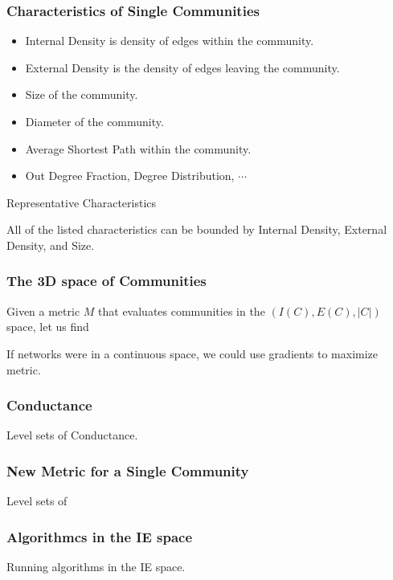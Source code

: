 \documentclass{beamer}
\begin{document}
\begin{frame}\frametitle{Characteristics of Single Communities}
\begin{itemize}
\item {\sc Internal Density} is density of edges within the community.
\item {\sc External Density} is the density of edges leaving the community.
\item {\sc Size} of the community.
\item {\sc Diameter} of the community.
\item {\sc Average Shortest Path} within the community.
\item {\sc Out Degree Fraction}, {\sc Degree Distribution},  $\cdots$
\end{itemize}

\begin{block}{Representative Characteristics}
\begin{center}
All of the listed characteristics can be bounded by {\sc Internal Density}, {\sc External Density}, and {\sc Size}.
\end{center}
\end{block}
\end{frame}



\begin{frame}\frametitle{The 3D space of Communities}
Given a metric $M$ that evaluates communities in the $(I(C), E(C), |C|)$ space, let us find

If networks were in a continuous space, we could use gradients to maximize metric.

\end{frame}



\begin{frame}\frametitle{Conductance}

Level sets of Conductance.

\end{frame}


\begin{frame}\frametitle{New Metric for a Single Community}

Level sets of 

\end{frame}




\begin{frame}\frametitle{Algorithmcs in the IE space}

Running algorithms in the IE space.

\end{frame}
\end{document}
